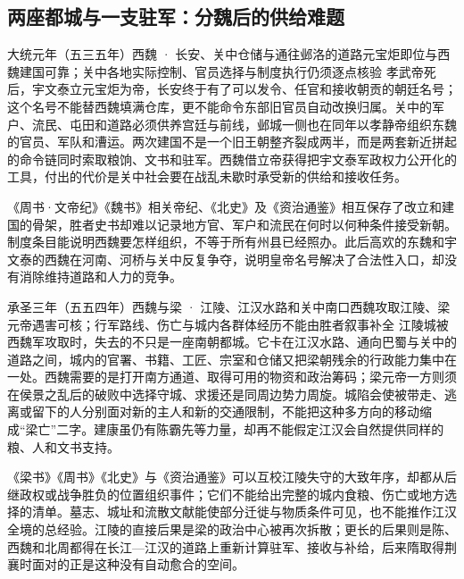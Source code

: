 \subsection{两座都城与一支驻军：分魏后的供给难题}
\begin{event}{}{大统元年（五三五年）}{西魏 · 长安、关中仓储与通往邺洛的道路}{元宝炬即位与西魏建国可靠；关中各地实际控制、官员选择与制度执行仍须逐点核验}
孝武帝死后，宇文泰立元宝炬为帝，长安终于有了可以发令、任官和接收朝贡的朝廷名号；这个名号不能替西魏填满仓库，更不能命令东部旧官员自动改换归属。关中的军户、流民、屯田和道路必须供养宫廷与前线，邺城一侧也在同年以孝静帝组织东魏的官员、军队和漕运。两次建国不是一个旧王朝整齐裂成两半，而是两套新近拼起的命令链同时索取粮饷、文书和驻军。西魏借立帝获得把宇文泰军政权力公开化的工具，付出的代价是关中社会要在战乱未歇时承受新的供给和接收任务。

《周书·文帝纪》《魏书》相关帝纪、《北史》及《资治通鉴》相互保存了改立和建国的骨架，胜者史书却难以记录地方官、军户和流民在何时以何种条件接受新朝。制度条目能说明西魏要怎样组织，不等于所有州县已经照办。此后高欢的东魏和宇文泰的西魏在河南、河桥与关中反复争夺，说明皇帝名号解决了合法性入口，却没有消除维持道路和人力的竞争。
\end{event}

\begin{event}{}{承圣三年（五五四年）}{西魏与梁 · 江陵、江汉水路和关中南口}{西魏攻取江陵、梁元帝遇害可核；行军路线、伤亡与城内各群体经历不能由胜者叙事补全}
江陵城被西魏军攻取时，失去的不只是一座南朝都城。它卡在江汉水路、通向巴蜀与关中的道路之间，城内的官署、书籍、工匠、宗室和仓储又把梁朝残余的行政能力集中在一处。西魏需要的是打开南方通道、取得可用的物资和政治筹码；梁元帝一方则须在侯景之乱后的破败中选择守城、求援还是同周边势力周旋。城陷会使被带走、逃离或留下的人分别面对新的主人和新的交通限制，不能把这种多方向的移动缩成“梁亡”二字。建康虽仍有陈霸先等力量，却再不能假定江汉会自然提供同样的粮、人和文书支持。

《梁书》《周书》《北史》与《资治通鉴》可以互校江陵失守的大致年序，却都从后继政权或战争胜负的位置组织事件；它们不能给出完整的城内食粮、伤亡或地方选择的清单。墓志、城址和流散文献能使部分迁徙与物质条件可见，也不能推作江汉全境的总经验。江陵的直接后果是梁的政治中心被再次拆散；更长的后果则是陈、西魏和北周都得在长江—江汉的道路上重新计算驻军、接收与补给，后来隋取得荆襄时面对的正是这种没有自动愈合的空间。
\end{event}